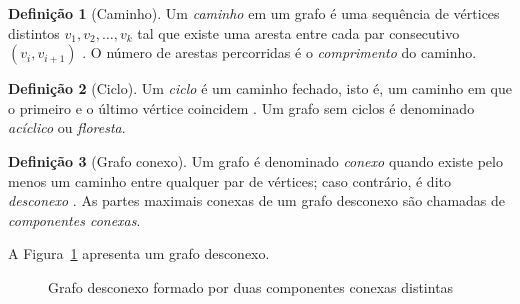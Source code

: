 \documentclass[
  12pt,
  oneside,
  a4paper,
  english,
  brazilian
  ]{abntex2}
\theoremstyle{definition}
\newtheorem{definicao}{Definição}[chapter]
\begin{document}
\begin{definicao}[Caminho]
  Um \textit{caminho} em um grafo é uma sequência de vértices distintos
  $v_1, v_2, \ldots, v_k$ tal que existe uma aresta entre cada par consecutivo
  $(v_i, v_{i+1})$ \cite{diestel2017}. O número de arestas percorridas é o
  \textit{comprimento} do caminho.
\end{definicao}

\begin{definicao}[Ciclo]
  Um \textit{ciclo} é um caminho fechado, isto é, um caminho em que o primeiro
  e o último vértice coincidem \cite{boaventura2009}. Um grafo sem ciclos é
  denominado \textit{acíclico} ou \textit{floresta}.
\end{definicao}

\begin{definicao}[Grafo conexo]
  Um grafo é denominado \textit{conexo} quando existe pelo menos um caminho
  entre qualquer par de vértices; caso contrário, é dito \textit{desconexo}
  \cite{rosen2012}. As partes maximais conexas de um grafo desconexo são
  chamadas de \textit{componentes conexas}.
\end{definicao}

A Figura~\ref{fig:conectividade} apresenta um grafo desconexo.

\begin{figure}[htbp]
    \centering
    \caption{Grafo desconexo formado por duas componentes conexas distintas}
    \label{fig:conectividade}
\end{figure}

\end{document}
